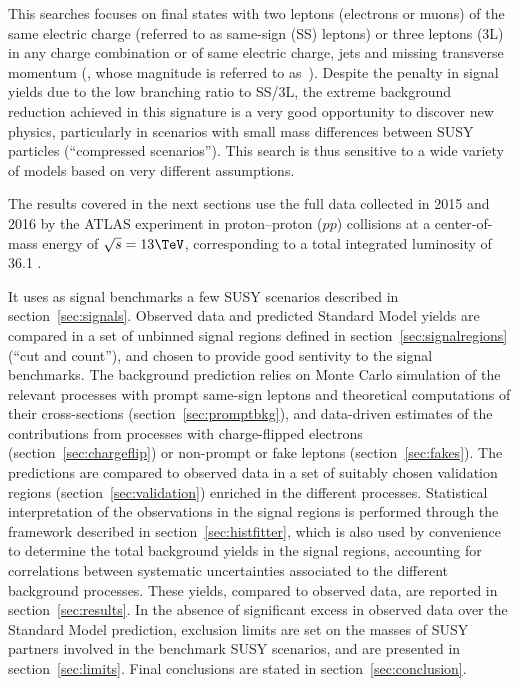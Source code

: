 This searches focuses  on  final states with two leptons (electrons or muons) 
of the same electric charge (referred to as same-sign (SS) leptons) or 
three leptons (3L) in any charge combination or of same electric charge, 
jets and missing transverse momentum 
(\Ptmiss, whose magnitude is referred to as~\met). 
 Despite the penalty in signal yields due to the low branching ratio to SS/3L, 
the extreme background reduction achieved in 
this signature is a very good opportunity to discover new physics, 
particularly in scenarios with small mass differences between SUSY particles 
(``compressed scenarios''). 
This search is thus sensitive to a wide variety of models based on very different assumptions.

The results covered in the next sections use the full data collected in 
2015 and 2016 by the ATLAS experiment in proton--proton ($pp$) collisions 
at a center-of-mass energy of $\sqrt s=13\TeV$, 
corresponding to a total integrated luminosity of 36.1 \ifb.

It uses as signal benchmarks a few SUSY scenarios described in section~\ref{sec:signals}. 
Observed data and predicted Standard Model yields are compared 
in a set of unbinned signal regions defined in section~\ref{sec:signalregions} (``cut and count''), 
and chosen to provide good sentivity to the signal benchmarks. 
The background prediction relies on Monte Carlo simulation of the relevant processes with prompt same-sign leptons 
and theoretical computations of their cross-sections (section~\ref{sec:promptbkg}), 
and data-driven estimates of the contributions from processes with charge-flipped electrons (section~\ref{sec:chargeflip}) 
or non-prompt or fake leptons (section~\ref{sec:fakes}). 
The predictions are compared to observed data in a set of suitably chosen validation regions (section~\ref{sec:validation}) 
enriched in the different processes. 
Statistical interpretation of the observations in the signal regions is performed through the framework described in section~\ref{sec:histfitter}, 
which is also used by convenience to determine the total background yields in the signal regions, 
accounting for correlations between systematic uncertainties associated to the different background processes. 
These yields, compared to observed data, are reported in section~\ref{sec:results}. 
In the absence of significant excess in observed data over the Standard Model prediction, 
exclusion limits are set on the masses of SUSY partners involved in the benchmark SUSY scenarios, and are presented in section~\ref{sec:limits}. 
Final conclusions are stated in section~\ref{sec:conclusion}.
